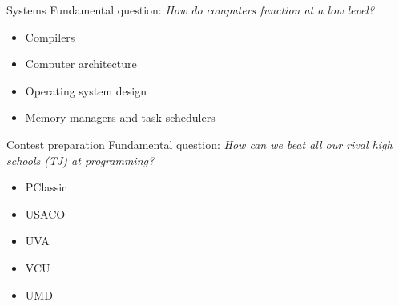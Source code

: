\documentclass{beamer}
\begin{document}
\begin{frame}{Systems}
Fundamental question: \textit{How do computers function at a low level?}
\vspace{0.1in}

\begin{itemize}
\item Compilers
\item Computer architecture
\item Operating system design
\item Memory managers and task schedulers
\end{itemize}
\end{frame}

\begin{frame}{Contest preparation}
Fundamental question: \textit{How can we beat all our rival high schools (TJ) at programming?}
\vspace{0.1in}

\begin{itemize}
\item PClassic
\item USACO
\item UVA
\item VCU
\item UMD
\end{itemize}
\end{frame}
\end{document}
